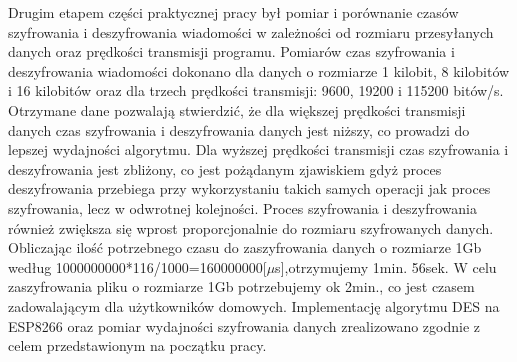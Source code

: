 \documentclass[12p]{article}
\begin{document}
\quad Drugim etapem części praktycznej pracy był pomiar i porównanie czasów szyfrowania i deszyfrowania wiadomości w zależności od rozmiaru przesyłanych danych oraz prędkości transmisji programu. Pomiarów czas szyfrowania i deszyfrowania wiadomości dokonano dla danych o rozmiarze 1 kilobit, 8 kilobitów i 16 kilobitów oraz dla trzech prędkości transmisji: 9600, 19200 i 115200 bitów/s. Otrzymane dane pozwalają stwierdzić, że dla większej prędkości transmisji danych czas szyfrowania i deszyfrowania danych jest niższy, co prowadzi do lepszej wydajności algorytmu. Dla wyższej prędkości transmisji czas szyfrowania i deszyfrowania jest zbliżony, co jest pożądanym zjawiskiem gdyż proces deszyfrowania przebiega przy wykorzystaniu takich samych operacji jak proces szyfrowania, lecz w odwrotnej kolejności. Proces szyfrowania i deszyfrowania również zwiększa się wprost proporcjonalnie do rozmiaru szyfrowanych danych. Obliczając ilość potrzebnego czasu do zaszyfrowania danych o rozmiarze 1Gb według 1000000000*116/1000=160000000[$\mu$s],otrzymujemy 1min. 56sek. W celu zaszyfrowania pliku o rozmiarze 1Gb potrzebujemy ok 2min., co jest czasem zadowalającym dla użytkowników domowych. Implementację algorytmu DES na ESP8266 oraz pomiar wydajności szyfrowania danych zrealizowano zgodnie z celem przedstawionym na początku pracy. 
\end{document}
